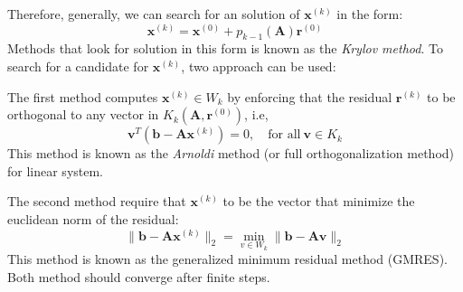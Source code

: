 \documentclass{article}
\begin{document}
Therefore, generally, we can search for an solution of $\mathbf{x}^{(k)}$ in the form:
\begin{equation}
    \mathbf{x}^{(k)} = \mathbf{x}^{(0)} + p_{k-1}(\mathbf{A}) \mathbf{r}^{(0)}
\end{equation}
Methods that look for solution in this form is known as the \emph{Krylov method}. 
To search for a candidate for $\mathbf{x}^{(k)}$, two approach can be used:

The first method computes $\mathbf{x}^{(k)}\in W_k$ by enforcing that the residual $\mathbf{r}^{(k)}$
to be orthogonal to any vector in $K_{k}(\mathbf{A},\mathbf{r}^{(0)})$, i.e, 
\begin{equation}
    \mathbf{v}^T \left( \mathbf{b} - \mathbf{A} \mathbf{x}^{(k)} \right) = 0
    ,\quad \text{for all}\ \mathbf{v} \in K_{k}
\end{equation}
This method is known as the \emph{Arnoldi} method (or full orthogonalization method) for linear system.

The second method require that $\mathbf{x}^{(k)}$ to be the 
vector that minimize the euclidean norm of the residual:
\begin{equation}
    \|\mathbf{b} - \mathbf{A} \mathbf{x}^{(k)}\|_2 
    = \min_{v\in W_k} \|\mathbf{b} - \mathbf{A} \mathbf{v}\|_2
\end{equation}
This method is known as the generalized minimum residual method (GMRES). Both method should converge after 
finite steps.
\end{document}
